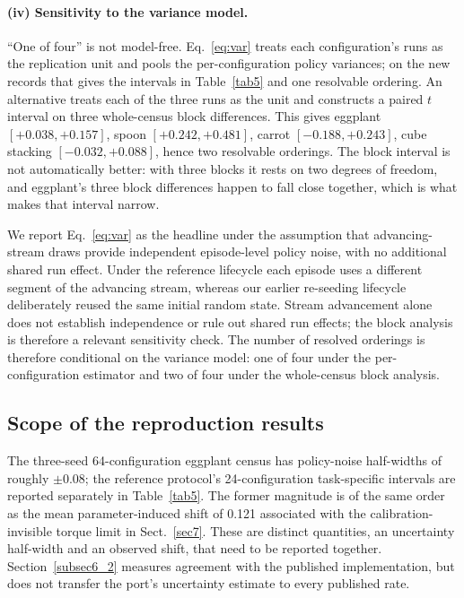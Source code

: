 \documentclass[pdflatex,iicol,sn-apa]{sn-jnl}
\theoremstyle{remark}
\begin{document}
\paragraph{(iv) Sensitivity to the variance model.}
``One of four'' is not model-free. Eq.~\eqref{eq:var} treats each configuration's runs as the
replication unit and pools the per-configuration policy variances; on the new records that gives the
intervals in Table~\ref{tab5} and one resolvable ordering. An alternative treats each of the
three runs as the unit and constructs a paired $t$ interval on three whole-census block differences. This gives
eggplant $[+0.038, +0.157]$, spoon $[+0.242, +0.481]$, carrot $[-0.188, +0.243]$, cube stacking
$[-0.032, +0.088]$, hence two resolvable orderings. The block interval is not automatically
better: with three blocks it rests on two degrees of freedom, and eggplant's three block differences
happen to fall close together, which is what makes that interval narrow.

We report Eq.~\eqref{eq:var} as the headline under the assumption that advancing-stream draws
provide independent episode-level policy noise, with no additional shared run effect. Under the
reference lifecycle each episode uses a different segment of the advancing stream, whereas our
earlier re-seeding lifecycle deliberately reused the same initial random state. Stream advancement
alone does not establish independence or rule out shared run effects; the block analysis is therefore
a relevant sensitivity check. The number of resolved orderings is therefore conditional on the
variance model: one of four under the per-configuration estimator and two of four under the
whole-census block analysis.

\subsection{Scope of the reproduction results}\label{subsec6_4}

The three-seed 64-configuration eggplant census has policy-noise half-widths of roughly $\pm 0.08$;
the reference protocol's 24-configuration task-specific intervals are reported separately in
Table~\ref{tab5}. The former magnitude is of the same order as the mean parameter-induced shift of
0.121 associated with the calibration-invisible torque limit in Sect.~\ref{sec7}. These are distinct
quantities, an uncertainty half-width and an observed shift, that need to be reported together.
Section~\ref{subsec6_2} measures agreement with the published implementation, but does not transfer
the port's uncertainty estimate to every published rate.
\end{document}
